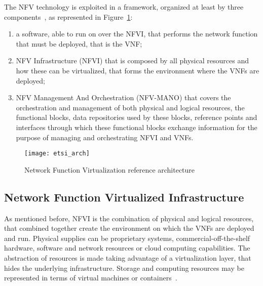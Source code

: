 The NFV technology is exploited in a framework, organized
at least by three components~\cite{etsi2013gs}, as represented in
Figure~\ref{chap:background:img:etsi_arch}:
\begin{enumerate}
  \item a software, able to run on over the NFVI, that performs the network
  function that must be deployed, that is the VNF;
  \item NFV Infrastructure (NFVI) that is composed by all physical resources
  and how these can be virtualized, that forms the environment where the VNFs
  are deployed;
  \item NFV Management And Orchestration (NFV-MANO) that covers the
  orchestration and management of both physical and logical resources, the
  functional blocks, data repositories used by these blocks, reference points
  and interfaces through which these functional blocks exchange
  information for the purpose of managing and orchestrating NFVI and VNFs.
\end{enumerate}

\begin{figure}
  \centering
  \texttt{[image: etsi\_arch]}
  \caption{Network Function Virtualization reference
  architecture~\cite{etsi2013gs}}
  \label{chap:background:img:etsi_arch}
\end{figure}

\subsection{Network Function Virtualized Infrastructure}
As mentioned before, NFVI is the combination of physical and logical resources,
that combined together create the environment on which the VNFs are deployed
and run. Physical supplies can be proprietary systems, commercial-off-the-shelf
hardware, software and network resources or cloud computing capabilities. The
abstraction of resources is made taking advantage of a virtualization layer,
that hides the underlying infrastructure. Storage and computing resources may
be represented in terms of virtual machines or
containers~\cite{mijumbi2016network}.



